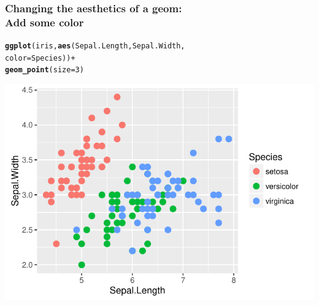 \documentclass{beamer}\usepackage[]{graphicx}\usepackage[]{color}
\makeatletter
\newcommand{\hlnum}[1]{\textcolor[rgb]{0.686,0.059,0.569}{#1}}%
\newcommand{\hlopt}[1]{\textcolor[rgb]{0,0,0}{#1}}%
\newcommand{\hlstd}[1]{\textcolor[rgb]{0.345,0.345,0.345}{#1}}%
\newcommand{\hlkwc}[1]{\textcolor[rgb]{0.333,0.667,0.333}{#1}}%
\newcommand{\hlkwd}[1]{\textcolor[rgb]{0.737,0.353,0.396}{\textbf{#1}}}%
\newenvironment{kframe}{%
 \def\at@end@of@kframe{}%
 \ifinner\ifhmode%
  \def\at@end@of@kframe{\end{minipage}}%
  \begin{minipage}{\columnwidth}%
 \fi\fi%
 \def\FrameCommand##1{\hskip\@totalleftmargin \hskip-\fboxsep
 \colorbox{shadecolor}{##1}\hskip-\fboxsep
     \hskip-\linewidth \hskip-\@totalleftmargin \hskip\columnwidth}%
 \MakeFramed {\advance\hsize-\width
   \@totalleftmargin\z@ \linewidth\hsize
   \@setminipage}}%
 {\par\unskip\endMakeFramed%
 \at@end@of@kframe}
\newenvironment{knitrout}{}{} %
\makeatother
\begin{document}
\begin{frame}[fragile]
\frametitle{Changing the aesthetics of a geom: \\Add some color}
\begin{knitrout}\footnotesize
{}\color{fgcolor}\begin{kframe}
\begin{alltt}
\hlkwd{ggplot}\hlstd{(iris,} \hlkwd{aes}\hlstd{(Sepal.Length, Sepal.Width,}
                \hlkwc{color} \hlstd{= Species))} \hlopt{+}
    \hlkwd{geom_point}\hlstd{(}\hlkwc{size} \hlstd{=} \hlnum{3}\hlstd{)}
\end{alltt}
\end{kframe}

{\centering \includegraphics[width=.75\linewidth]{figure/first_plot_color-1} 

}



\end{knitrout}
\end{frame}

\end{document}
